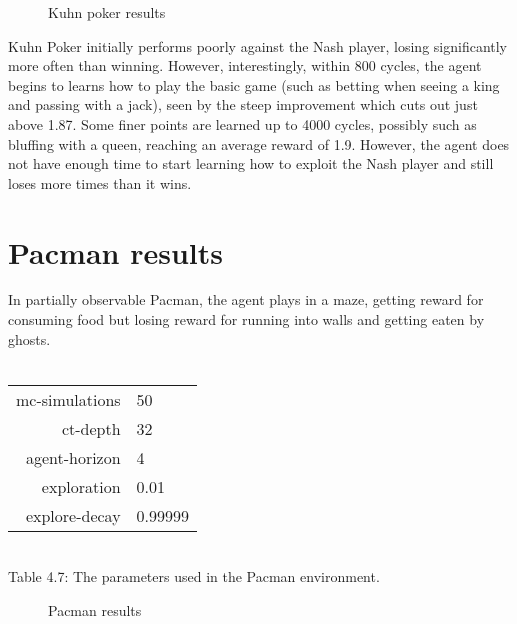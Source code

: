 \documentclass[pdftex,twoside,a4paper]{report}
\begin{document}
\begin{figure}[h]
  \begin{center}
  \end{center}
  \caption{Kuhn poker results}
  \label{fig:kuhn_results}
\end{figure}

Kuhn Poker initially performs poorly against the Nash player, losing significantly more often than winning. However, interestingly, within 800 cycles, the agent begins to learns how to play the basic game (such as betting when seeing a king and passing with a jack), seen by the steep improvement which cuts out just above 1.87. Some finer points are learned up to 4000 cycles, possibly such as bluffing with a queen, reaching an average reward of 1.9. However, the agent does not have enough time to start learning how to exploit the Nash player and still loses more times than it wins.

\section{Pacman results}
In partially observable Pacman, the agent plays in a maze, getting reward for consuming food but losing reward for running into walls and getting eaten by ghosts.\\\\
\begin{center}
\begin{tabular}{| r | l | }
\hline
mc-simulations & 50\\
ct-depth & 32\\
agent-horizon & 4\\
exploration & 0.01\\
explore-decay & 0.99999\\
\hline
\end{tabular}\\
\vspace{0.5mm}
Table 4.7: The parameters used in the Pacman environment.
\end{center}

\begin{figure}[h]
  \begin{center}
  \end{center}
  \caption{Pacman results}
  \label{fig:pacman_results}
\end{figure}



\end{document}
